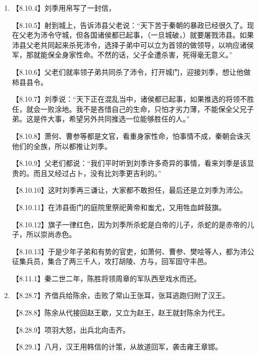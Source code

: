 \documentclass[fontset=none,11pt,a4paper]{ctexart}
\begin{document}
\begin{enumerate}[label=\Alph*.]
\noindent 【8.22.8】沛公派人与秦朝官吏巡行县城乡间，告谕百姓。\par
\noindent 【8.22.9】秦地的百姓大为高兴，争先恐后地拿出牛羊酒食款待士兵。\par
\noindent 【8.22.10】沛公又谦让不肯接受，说：“仓库的谷子很多，不缺乏，不愿破费百姓。”百姓更加高兴，唯恐沛公不做秦王。\par
  \item
\noindent 【8.10.4】刘季用帛写了一封信，\par
\noindent 【8.10.5】射到城上，告诉沛县父老说：“天下苦于秦朝的暴政已经很久了。现在父老为沛令守城，但各国诸侯都已起事，（一旦城破，）就要屠戮沛县。如果沛县父老共同起来杀死沛令，选择子弟中可以立为首领的做领导，以响应诸侯军，那就能保全身家性命。不然的话，父子全遭杀害，死得毫无意义。”\par
\noindent 【8.10.6】父老们就率领子弟共同杀了沛令，打开城门，迎接刘季，想让他做柿县县令。\par
\noindent 【8.10.7】刘季说：“天下正在混乱当中，诸侯都已起事，如果推选的将领不胜任，就会一败涂地。我不是吝惜自己的生命，只怕才劣力薄，不能保全父兄子弟。这是件大事，希望另外共同推选一位能够胜任的人。”\par
\noindent 【8.10.8】萧何、曹参等都是文官，看重身家性命，怕事情不成，秦朝会诛灭他们的全族，所以都推让刘季。\par
\noindent 【8.10.9】父老们都说：“我们平时听到刘季许多奇异的事情，看来刘季是该显贵的。而且又经过占卜，没有比刘季更吉利的。”\par
\noindent 【8.10.10】这时刘季再三谦让，大家都不敢担任，最后还是立刘季为沛公。\par
\noindent 【8.10.11】在沛县衙门的庭院里祭祀黄帝和蚩尤，又用牲血衅鼓旗。\par
\noindent 【8.10.12】旗子一律红色，因为刘季所杀蛇是白帝的儿子，杀蛇的是赤帝的儿子，所以崇尚赤色。\par
\noindent 【8.10.13】于是少年子弟和有势的官吏，如萧何、曹参、樊哙等人，都为沛公征集兵员，集合了两三千人，攻打胡陵、方与，回军固守丰邑。\par
\noindent 【8.11.1】秦二世二年，陈胜将领周章的军队西至戏水而还。\par
  \item
\noindent 【8.28.7】齐借兵给陈余，击败了常山王张耳，张耳逃跑归附了汉王。\par
\noindent 【8.28.8】陈余从代接回赵王歇，又立为赵王，赵王就封陈余为代王。\par
\noindent 【8.28.9】项羽大怒，出兵北向击齐。\par
\noindent 【8.29.1】八月，汉王用韩信的计策，从故道回军，袭击雍王章邯。\par

\end{enumerate}
\end{document}
